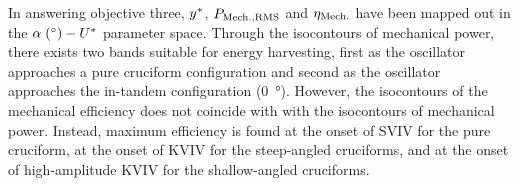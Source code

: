 \documentclass[oneside]{utmthesis}
\begin{document}




In answering objective three, $y^{*}$, $P_{\text{Mech.,RMS}}$ and $\eta_{\text{Mech.}}$ have been mapped out in the $\alpha \; (\si{\degree})-\ured$ parameter space. Through the isocontours of mechanical power, there exists two bands suitable for energy harvesting, first as the oscillator approaches a pure cruciform configuration and second as the oscillator approaches the in-tandem configuration (\SI{0}{\degree}). However, the isocontours of the mechanical efficiency does not coincide with with the isocontours of mechanical power. Instead, maximum efficiency is found at the onset of SVIV for the pure cruciform, at the onset of KVIV for the steep-angled cruciforms, and at the onset of high-amplitude KVIV for the shallow-angled cruciforms.

\end{document}
